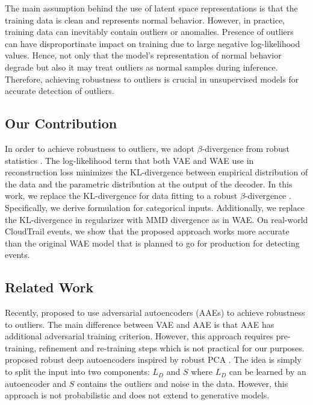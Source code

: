 \documentclass{article}
\theoremstyle{plain}
\theoremstyle{definition}
\begin{document}
The main assumption behind the use of latent space representations is that the training data is clean and represents normal behavior. However, in practice, training data can inevitably contain outliers or anomalies. Presence of outliers can have disproportinate impact on training due to large negative log-likelihood values. Hence, not only that the model's representation of normal behavior degrade but also it may treat outliers as normal samples during inference. Therefore, achieving robustness to outliers is crucial in unsupervised models for accurate detection of outliers.

\subsection{Our Contribution}
In order to achieve robustness to outliers, we adopt $\beta$-divergence from robust statistics \cite{futami2017variational}. The log-likelihood term that both VAE and WAE use in reconstruction loss minimizes the KL-divergence between empirical distribution of the data and the  parametric distribution at the output of the decoder. In this work, we replace the KL-divergence for data fitting to a robust $\beta$-divergence \cite{basu1998robust}. Specifically, we derive formulation for categorical inputs. Additionally, we replace the KL-divergence in regularizer with MMD divergence as in WAE. On real-world CloudTrail events, we show that the proposed approach works more accurate than the original WAE model that is planned to go for production for detecting events.

\subsection{Related Work}
Recently, \cite{beggel2019robust} proposed to use adversarial autoencoders (AAEs) to achieve robustness to outliers. The main difference between VAE and AAE is that AAE has additional adversarial training criterion. However, this approach requires pre-training, refinement and re-training steps which is not practical for our purposes. \citet{zhou2017anomaly} proposed robust deep autoencoders inspired by robust PCA \cite{candes2011robust}. The idea is simply to split the input into two components: $L_D$ and $S$ where $L_D$ can be learned by an autoencoder and $S$ contains the outliers and noise in the data. However, this approach is not probabilistic and does not extend to generative models.
\end{document}

